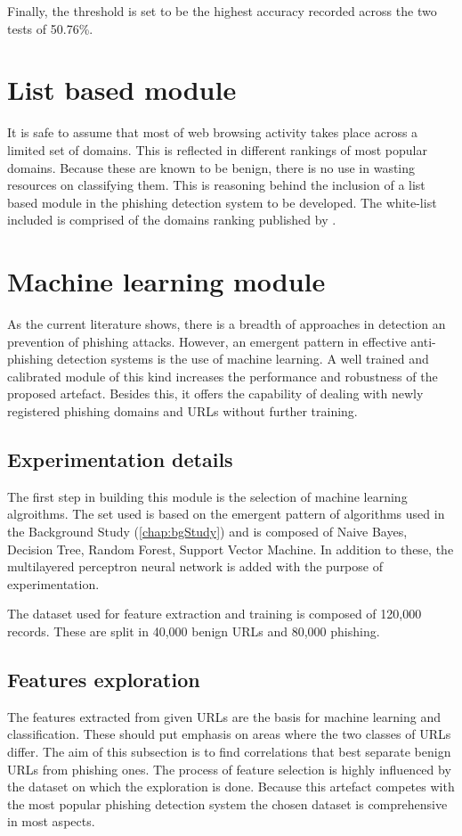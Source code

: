 Finally, the threshold is set to be the highest accuracy recorded across the two tests of 50.76\%.

\section{List based module}
It is safe to assume that most of web browsing activity takes place across a limited set of domains. This is reflected in different rankings of most popular domains. Because these are known to be benign, there is no use in wasting resources on classifying them. This is reasoning behind the inclusion of a list based module in the phishing detection system to be developed.
The white-list included is comprised of the domains ranking published by \cite{MAJESTIC_MILLION}.

\section{Machine learning module}
As the current literature shows, there is a breadth of approaches in detection an prevention of phishing attacks. However, an emergent pattern in effective anti-phishing detection systems is the use of machine learning. A well trained and calibrated module of this kind increases the performance and robustness of the proposed artefact. Besides this, it offers the capability of dealing with newly registered phishing domains and URLs without further training.

\subsection{Experimentation details}
The first step in building this module is the selection of machine learning algroithms. The set used is based on the emergent pattern of algorithms used in the Background Study (\ref{chap:bgStudy}) and is composed of Naive Bayes, Decision Tree, Random Forest, Support Vector Machine. In addition to these, the multilayered perceptron neural network is added with the purpose of experimentation.

The dataset used for feature extraction and training is composed of 120,000 records. These are split in 40,000 benign URLs and 80,000 phishing.

\subsection{Features exploration}
The features extracted from given URLs are the basis for machine learning and classification. These should put emphasis on areas where the two classes of URLs differ. The aim of this subsection is to find correlations that best separate benign URLs from phishing ones. The process of feature selection is highly influenced by the dataset on which the exploration is done. Because this artefact competes with the most popular phishing detection system the chosen dataset is comprehensive in most aspects.


